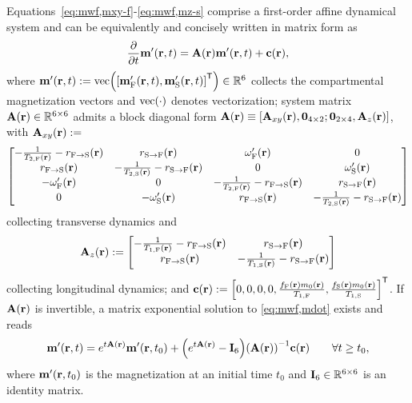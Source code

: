 Equations~\eqref{eq:mwf,mxy-f}-\eqref{eq:mwf,mz-s}
comprise a first-order affine dynamical system
and can be equivalently and concisely written
in matrix form as
\begin{align}
	\dela{t} \bmmp\prt = \bmA\pr \bmmp\prt + \bmc\pr,
	\label{eq:mwf,mdot}
\end{align}	
where $\bmmp\prt := \vect{\brac{\bmmpf\prt, \bmmps\prt}\tpose} \in \reals{6}$
collects the compartmental magnetization vectors
and $\vect{\cdot}$ denotes vectorization;
system matrix $\bmA\pr \in \reals{6 \times 6}$ 
admits a block diagonal form
$\bmA\pr \equiv \brac{\bmAxy\pr, \zeros{4 \times 2}; \zeros{2 \times 4}, \bmAz\pr}$,
with $\bmAxy\pr :=$
\begin{align}
	\begin{bmatrix}
		-\frac{1}{\tf{2}\pr}-\rfs\pr & \rsf\pr & \ompf\pr & 0 \\
		\rfs\pr & -\frac{1}{\ts{2}\pr}-\rsf\pr & 0 & \omps\pr \\
		-\ompf\pr & 0 & -\frac{1}{\tf{2}\pr}-\rfs\pr & \rsf\pr \\
		0 & -\omps\pr & \rfs\pr & -\frac{1}{\ts{2}\pr}-\rsf\pr 
		\label{eq:mwf,Axy}
	\end{bmatrix}
\end{align}
collecting transverse dynamics and
\begin{align}
	\bmAz\pr :=
	\begin{bmatrix}
		-\frac{1}{\tf{1}\pr}-\rfs\pr & \rsf\pr \\
		\rfs\pr & -\frac{1}{\ts{1}\pr}-\rsf\pr
		\label{eq:mwf,Az}
	\end{bmatrix}
\end{align}
collecting longitudinal dynamics; and
$\bmc\pr := \brac{0, 0, 0, 0, 
\frac{\ff\pr \mzero\pr}{\tf{1}}, 
\frac{\fs\pr \mzero\pr}{\ts{1}}}\tpose$.
If $\bmA\pr$ is invertible,
a matrix exponential solution 
to \eqref{eq:mwf,mdot}
exists and reads
\begin{align}
	\bmmp\prt = e^{t\bmA\pr} \bmmp\prtz +
	\paren{e^{t\bmA\pr} - \eye{6}} \inv{\bmA\pr} \bmc\pr
	\qquad \forall t \geq t_0,
	\label{eq:mwf,m}
\end{align}
where $\bmmp\prtz$ is the magnetization
at an initial time $t_0$
and $\mathbf{I}_{6} \in \mathbb{R}^{6 \times 6}$ 
is an identity matrix.

